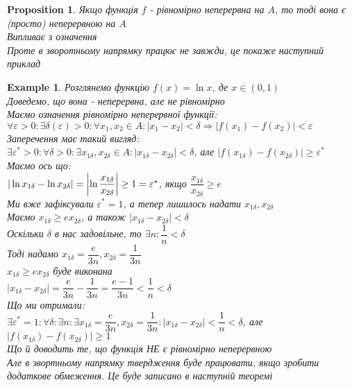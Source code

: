 \documentclass[a4paper, 14pt]{extarticle}
\theoremstyle{theoremdd}
\theoremstyle{theoremdd}
\theoremstyle{theoremdd}
\theoremstyle{theoremdd}
\newtheorem{example}[theorem]{Example}
\theoremstyle{theoremdd}
\newtheorem{proposition}[theorem]{Proposition}
\theoremstyle{theoremdd}
\theoremstyle{theoremdd}
\theoremstyle{theoremdd}
\begin{document}
\begin{proposition}
Якщо функція $f$ - рівномірно неперервна на $A$, то тоді вона є (просто) неперервною на $A$\\
\textit{Випливає з означення}\\
Проте в зворотньому напрямку працює не завжди, це покаже наступний приклад
\end{proposition}

\begin{example}
Розглянемо функцію $f(x) = \ln x$, де $x \in (0,1)$\\
Доведемо, що вона - неперервна, але не рівномірно\\
Маємо означення рівномірно неперервної функції:\\
$\forall \varepsilon > 0: \exists \delta(\varepsilon) > 0: \forall x_1,x_2 \in A: |x_1-x_2|<\delta \Rightarrow |f(x_1) - f(x_2)| < \varepsilon$\\
Заперечення має такий вигляд:\\
$\exists \varepsilon^* > 0: \forall \delta > 0: \exists x_{1 \delta},x_{2 \delta} \in A: |x_{1 \delta}-x_{2 \delta}|<\delta$, але $|f(x_{1 \delta}) - f(x_{2 \delta})| \geq \varepsilon^*$\\
Маємо ось що:\\
$|\ln x_{1 \delta} - \ln x_{2 \delta}| = \abs{\ln \dfrac{x_{1 \delta}}{x_{2 \delta}}} \geq 1 = \varepsilon^*$, якщо $\dfrac{x_{1 \delta}}{x_{2 \delta}} \geq e$\\
Ми вже зафіксували $\varepsilon^* = 1$, а тепер лишилось надати $x_{1 \delta}, x_{2 \delta}$\\
Маємо $x_{1 \delta} \geq e x_{2 \delta}$, а також $|x_{1 \delta} - x_{2 \delta}| < \delta$\\
Оскільки $\delta$ в нас задовільне, то $\exists n: \dfrac{1}{n} < \delta$\\
Тоді надамо $x_{1 \delta} = \dfrac{e}{3n}, x_{2 \delta} = \dfrac{1}{3n}$\\
$x_{1 \delta} \geq e x_{2 \delta}$ буде виконана\\
$|x_{1 \delta} - x_{2 \delta}| = \dfrac{e}{3n} - \dfrac{1}{3n} = \dfrac{e-1}{3n} < \dfrac{1}{n} < \delta$\\
Що ми отримали:\\
$\exists \varepsilon^* = 1: \forall \delta: \exists n: \exists x_{1 \delta} = \dfrac{e}{3n}, x_{2 \delta} = \dfrac{1}{3n}: |x_{1 \delta} - x_{2 \delta}| < \dfrac{1}{n} < \delta$, але $|f(x_{1\delta}) - f(x_{2 \delta})| \geq 1$\\
Що й доводить те, що функція НЕ є рівномірно неперервною\\
Але в звортньому напрямку твердження буде працювати, якщо зробити додаткове обмеження. Це буде записано в наступній теоремі
\end{example}
\end{document}
